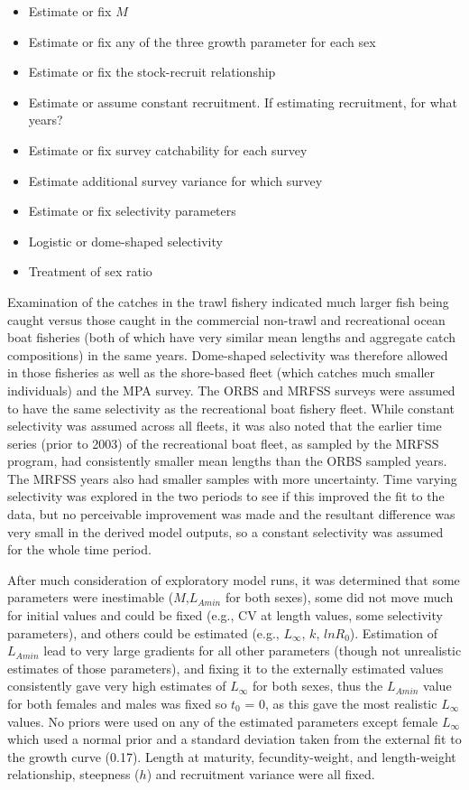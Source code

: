 \documentclass[11pt,
  letterpaper,
]{article}
\providecommand{\tightlist}{%
  \setlength{\itemsep}{0pt}\setlength{\parskip}{0pt}}
\providecommand{\tightlist}{%
  \setlength{\itemsep}{0pt}\setlength{\parskip}{0pt}}
\begin{document}
\begin{itemize}
\tightlist
\item
  Estimate or fix \(M\)
\item
  Estimate or fix any of the three growth parameter for each sex
\item
  Estimate or fix the stock-recruit relationship
\item
  Estimate or assume constant recruitment. If estimating recruitment, for what years?
\item
  Estimate or fix survey catchability for each survey
\item
  Estimate additional survey variance for which survey
\item
  Estimate or fix selectivity parameters
\item
  Logistic or dome-shaped selectivity
\item
  Treatment of sex ratio
\end{itemize}

Examination of the catches in the trawl fishery indicated much larger fish being caught versus those caught in the commercial non-trawl and recreational ocean boat fisheries (both of which have very similar mean lengths and aggregate catch compositions) in the same years. Dome-shaped selectivity was therefore allowed in those fisheries as well as the shore-based fleet (which catches much smaller individuals) and the MPA survey. The ORBS and MRFSS surveys were assumed to have the same selectivity as the recreational boat fishery fleet. While constant selectivity was assumed across all fleets, it was also noted that the earlier time series (prior to 2003) of the recreational boat fleet, as sampled by the MRFSS program, had consistently smaller mean lengths than the ORBS sampled years. The MRFSS years also had smaller samples with more uncertainty. Time varying selectivity was explored in the two periods to see if this improved the fit to the data, but no perceivable improvement was made and the resultant difference was very small in the derived model outputs, so a constant selectivity was assumed for the whole time period.

After much consideration of exploratory model runs, it was determined that some parameters were inestimable (\(M\),\(L_{Amin}\) for both sexes), some did not move much for initial values and could be fixed (e.g., CV at length values, some selectivity parameters), and others could be estimated (e.g., \(L_{\infty}\), \(k\), \(lnR_0\)). Estimation of \(L_{Amin}\) lead to very large gradients for all other parameters (though not unrealistic estimates of those parameters), and fixing it to the externally estimated values consistently gave very high estimates of \(L_{\infty}\) for both sexes, thus the \(L_{Amin}\) value for both females and males was fixed so \(t_0\) = 0, as this gave the most realistic \(L_{\infty}\) values. No priors were used on any of the estimated parameters except female \(L_{\infty}\) which used a normal prior and a standard deviation taken from the external fit to the growth curve (0.17). Length at maturity, fecundity-weight, and length-weight relationship, steepness (\(h\)) and recruitment variance were all fixed.
\end{document}
